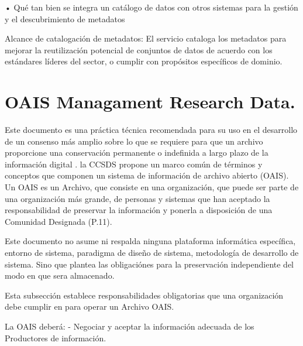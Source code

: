 \documentclass[
  14pt,
]{book}
\begin{document}
• Qué tan bien se integra un catálogo de datos con otros sistemas para la gestión y el descubrimiento de metadatos

Alcance de catalogación de metadatos: El servicio cataloga los metadatos para mejorar la reutilización potencial de conjuntos de datos de acuerdo con los estándares líderes del sector, o cumplir con propósitos específicos de dominio.

\hypertarget{oais-managament-research-data.}{%
\section{OAIS Managament Research Data.}\label{oais-managament-research-data.}}

Este documento es una práctica técnica recomendada para su uso en el desarrollo de un consenso más amplio sobre lo que se requiere para que un archivo proporcione una conservación permanente o indefinida a largo plazo de la información digital \citep[p.3]{ccsds_Recommendation_2012}. la CCSDS propone un marco común de términos y conceptos que componen un sistema de información de archivo abierto (OAIS). Un OAIS es un Archivo, que consiste en una organización, que puede ser parte de una organización más grande, de personas y sistemas que han aceptado la responsabilidad de preservar la información y ponerla a disposición de una Comunidad Designada (P.11).

Este documento no asume ni respalda ninguna plataforma informática específica, entorno de sistema, paradigma de diseño de sistema, metodología de desarrollo de sistema. Sino que plantea las obligaciónes para la preservación independiente del modo en que sera almacenado.

Esta subsección establece responsabilidades obligatorias que una organización debe cumplir en para operar un Archivo OAIS.

La OAIS deberá:
- Negociar y aceptar la información adecuada de los Productores de información.
\end{document}
